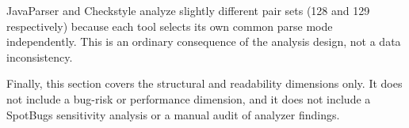 JavaParser and Checkstyle analyze slightly different pair sets (128 and 129 respectively) because each tool selects its own common parse mode independently.
This is an ordinary consequence of the analysis design, not a data inconsistency.

Finally, this section covers the structural and readability dimensions only.
It does not include a bug-risk or performance dimension, and it does not include a SpotBugs sensitivity analysis or a manual audit of analyzer findings.


%
%
%
